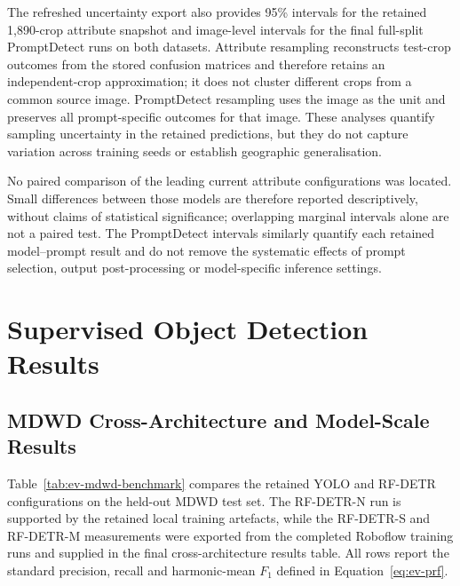 The refreshed uncertainty export also provides 95\% intervals for the retained 1,890-crop attribute snapshot and image-level intervals for the final full-split PromptDetect runs on both datasets. Attribute resampling reconstructs test-crop outcomes from the stored confusion matrices and therefore retains an independent-crop approximation; it does not cluster different crops from a common source image. PromptDetect resampling uses the image as the unit and preserves all prompt-specific outcomes for that image. These analyses quantify sampling uncertainty in the retained predictions, but they do not capture variation across training seeds or establish geographic generalisation.

No paired comparison of the leading current attribute configurations was located. Small differences between those models are therefore reported descriptively, without claims of statistical significance; overlapping marginal intervals alone are not a paired test. The PromptDetect intervals similarly quantify each retained model--prompt result and do not remove the systematic effects of prompt selection, output post-processing or model-specific inference settings.

\clearpage
\section{Supervised Object Detection Results}
\label{sec:ev-supervised}
\subsection{MDWD Cross-Architecture and Model-Scale Results}
\label{sec:ev-mdwd-supervised}
Table~\ref{tab:ev-mdwd-benchmark} compares the retained YOLO and RF-DETR configurations on the held-out \gls{MDWD} test set. The RF-DETR-N run is supported by the retained local training artefacts, while the RF-DETR-S and RF-DETR-M measurements were exported from the completed Roboflow training runs and supplied in the final cross-architecture results table. All rows report the standard precision, recall and harmonic-mean \(F_1\) defined in Equation~\ref{eq:ev-prf}.

